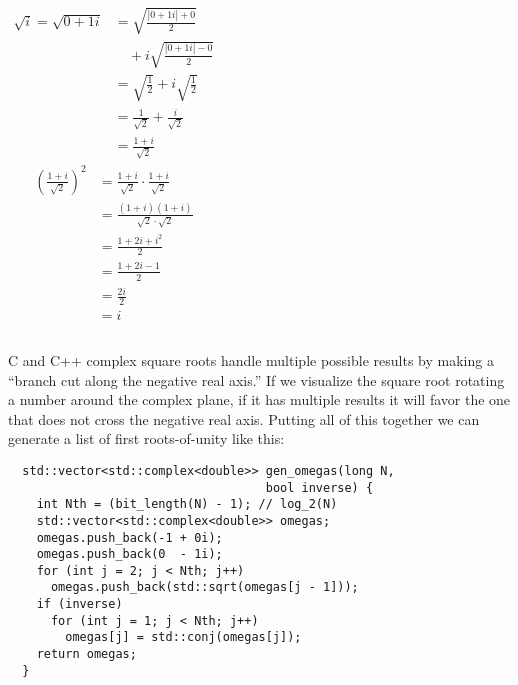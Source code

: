 \documentclass{beamer}
\begin{document}
\begin{frame}
  \begin{columns}
    \begin{align*}
      \sqrt{i} = \sqrt{0+1i} & = \sqrt{\frac{|0+1i| + 0}{2}}              \\
                             & \quad + i\sqrt{\frac{|0+1i| - 0}{2}}       \\
                             & = \sqrt{\frac{1}{2}} + i\sqrt{\frac{1}{2}} \\
                             & = \frac{1}{\sqrt{2}} + \frac{i}{\sqrt{2}}  \\
                             & = \frac{1+i}{\sqrt{2}}
    \end{align*}
    \begin{align*}
      \left(\frac{1+i}{\sqrt{2}}\right)^2 & = \frac{1+i}{\sqrt{2}} \cdot \frac{1+i}{\sqrt{2}} \\
                                          & = \frac{(1+i)(1+i)}{\sqrt{2}\cdot\sqrt{2}}        \\
                                          & = \frac{1+2i+i^2}{2}                              \\
                                          & = \frac{1+2i-1}{2}                                \\
                                          & = \frac{2i}{2}                                    \\
                                          & = i
    \end{align*}
  \end{columns}
\end{frame}

\begin{frame}[fragile]
  C and C++ complex square roots handle multiple possible results by making a ``branch cut along the negative real axis.'' If we visualize the square root rotating a number around the complex plane, if it has multiple results it will favor the one that does not cross the negative real axis. Putting all of this together we can generate a list of first roots-of-unity like this:
  \begin{lstlisting}
  std::vector<std::complex<double>> gen_omegas(long N, 
                                    bool inverse) {
    int Nth = (bit_length(N) - 1); // log_2(N)
    std::vector<std::complex<double>> omegas;
    omegas.push_back(-1 + 0i);
    omegas.push_back(0  - 1i);
    for (int j = 2; j < Nth; j++) 
      omegas.push_back(std::sqrt(omegas[j - 1]));
    if (inverse)
      for (int j = 1; j < Nth; j++) 
        omegas[j] = std::conj(omegas[j]);
    return omegas;
  }
  \end{lstlisting}
\end{frame}
\end{document}
